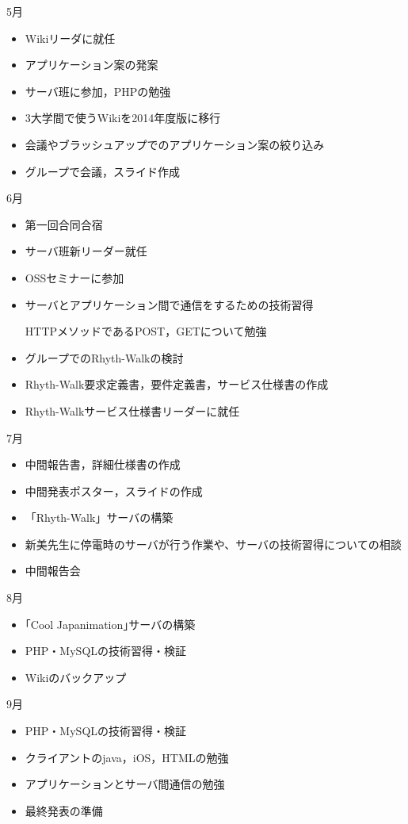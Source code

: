 \par
5月
\begin{itemize}
\item Wikiリーダに就任
\item アプリケーション案の発案
\item サーバ班に参加，PHPの勉強
\item 3大学間で使うWikiを2014年度版に移行
\item 会議やブラッシュアップでのアプリケーション案の絞り込み
\item グループで会議，スライド作成
\end{itemize}
6月
\begin{itemize}
\item 第一回合同合宿
\item サーバ班新リーダー就任
\item OSSセミナーに参加
\item サーバとアプリケーション間で通信をするための技術習得
\par  HTTPメソッドであるPOST，GETについて勉強
\item グループでのRhyth-Walkの検討
\item Rhyth-Walk要求定義書，要件定義書，サービス仕様書の作成
\item Rhyth-Walkサービス仕様書リーダーに就任
\end{itemize}
7月
\begin{itemize}
\item 中間報告書，詳細仕様書の作成
\item 中間発表ポスター，スライドの作成
\item 「Rhyth-Walk」サーバの構築
\item 新美先生に停電時のサーバが行う作業や、サーバの技術習得についての相談
\item 中間報告会
\end{itemize}
8月
\begin{itemize}
\item ｢Cool Japanimation｣サーバの構築
\item PHP・MySQLの技術習得・検証
\item Wikiのバックアップ
\end{itemize}
9月
\begin{itemize}
\item PHP・MySQLの技術習得・検証
\item クライアントのjava，iOS，HTMLの勉強
\item アプリケーションとサーバ間通信の勉強
\item 最終発表の準備
\end{itemize}
